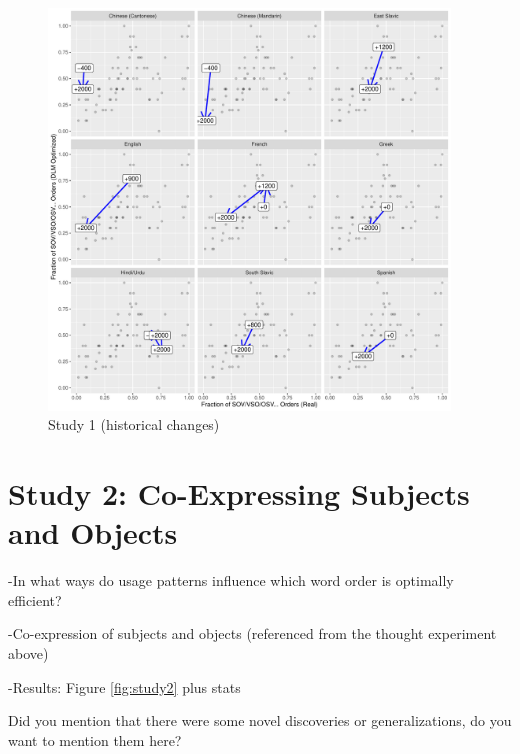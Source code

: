 \documentclass[11pt,a4paper]{article}
\begin{document}
\begin{figure}
    \centering
    \includegraphics[width=0.95\textwidth]{figures/historical_2.6_times.pdf}
    \caption{Study 1 (historical changes)}
    \label{fig:historical}
\end{figure}




\section{Study 2: Co-Expressing Subjects and Objects}

-In what ways do usage patterns influence which word order is optimally efficient?

-Co-expression of subjects and objects (referenced from the thought experiment above)

-Results: Figure \ref{fig:study2} plus stats

{\color{blue}Did you mention that there were some novel discoveries or generalizations, do you want to mention them here?}
\end{document}
